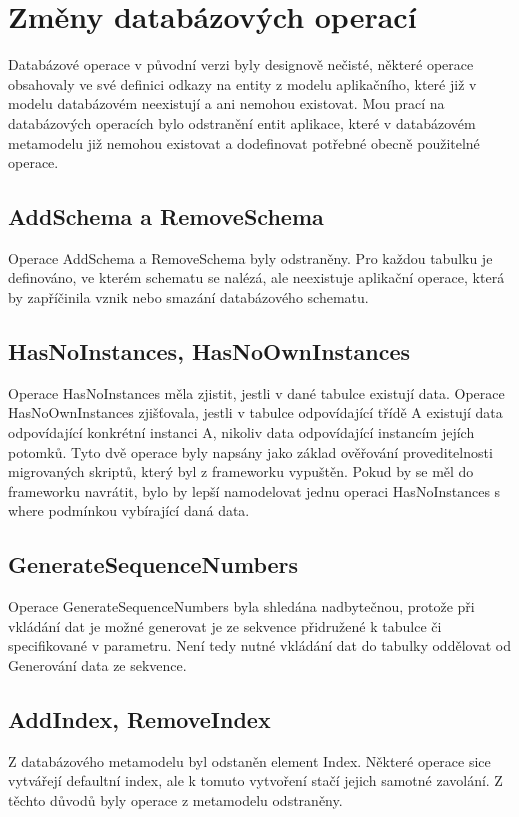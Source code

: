 \documentclass[11pt,twoside,a4paper]{book}
\begin{document}
\section{Změny databázových operací}

Databázové operace v původní verzi byly designově nečisté, některé operace
obsahovaly ve své definici odkazy na entity z modelu aplikačního, které již v
modelu databázovém neexistují a ani nemohou existovat. Mou prací na databázových
operacích bylo odstranění entit aplikace, které v databázovém metamodelu již
nemohou existovat a dodefinovat potřebné obecně použitelné operace.

\subsection{AddSchema a RemoveSchema}
Operace AddSchema a RemoveSchema byly odstraněny. Pro každou tabulku je
definováno, ve kterém schematu se nalézá, ale neexistuje aplikační operace,
která by zapříčinila vznik nebo smazání databázového schematu.

\subsection{HasNoInstances, HasNoOwnInstances}
Operace HasNoInstances měla zjistit, jestli v dané tabulce existují data.
Operace HasNoOwnInstances zjišťovala, jestli v tabulce odpovídající třídě A
existují data odpovídající konkrétní instanci A, nikoliv data odpovídající
instancím jejích potomků.
Tyto dvě operace byly napsány jako základ ověřování proveditelnosti migrovaných
skriptů, který byl z frameworku vypuštěn. Pokud by se měl do frameworku
navrátit, bylo by lepší namodelovat jednu operaci HasNoInstances s where
podmínkou vybírající daná data.

\subsection{GenerateSequenceNumbers}
Operace GenerateSequenceNumbers byla shledána nadbytečnou, protože při vkládání
dat je možné generovat je ze sekvence přidružené k tabulce či specifikované v
parametru. Není tedy nutné vkládání dat do tabulky oddělovat od Generování data
ze sekvence.

\subsection{AddIndex, RemoveIndex}
Z databázového metamodelu byl odstaněn element Index. Některé operace sice
vytvářejí defaultní index, ale k tomuto vytvoření stačí jejich samotné zavolání.
Z těchto důvodů byly operace z metamodelu odstraněny.
\end{document}

